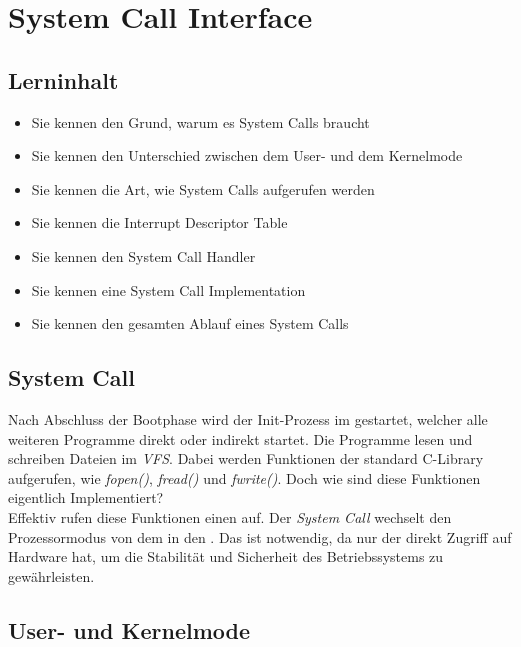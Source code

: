\section{System Call Interface}
\label{sec:syscall}

\subsection{Lerninhalt}

\begin{itemize}
   \item Sie kennen den Grund, warum es System Calls braucht
   \item Sie kennen den Unterschied zwischen dem User- und dem Kernelmode
   \item Sie kennen die Art, wie System Calls aufgerufen werden
   \item Sie kennen die Interrupt Descriptor Table
   \item Sie kennen den System Call Handler
   \item Sie kennen eine System Call Implementation
   \item Sie kennen den gesamten Ablauf eines System Calls
\end{itemize}

\subsection{System Call}

Nach Abschluss der Bootphase wird der Init-Prozess im  gestartet, welcher alle weiteren Programme
direkt oder indirekt startet. Die Programme lesen und schreiben Dateien im \emph{VFS}. Dabei werden Funktionen der
standard C-Library  aufgerufen, wie \emph{fopen()}, \emph{fread()} und \emph{fwrite()}. Doch wie sind
diese Funktionen eigentlich Implementiert? \\

Effektiv rufen diese Funktionen einen  auf. Der \emph{System Call} wechselt den Prozessormodus
von dem  in den . Das ist notwendig, da nur der  direkt Zugriff
auf Hardware hat, um die Stabilität und Sicherheit des Betriebssystems zu gewährleisten.

\subsection{User- und Kernelmode}

